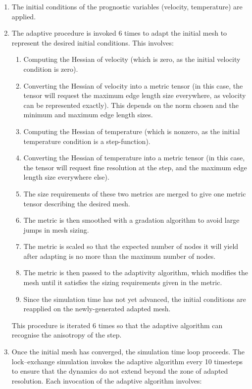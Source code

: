 \begin{enumerate}
\item The initial conditions of the prognostic variables (velocity, temperature) are applied.
\item The adaptive procedure is invoked 6 times to adapt the initial mesh to represent the
desired initial conditions. This involves:
  \begin{enumerate}
  \item Computing the Hessian of velocity (which is zero, as the initial velocity condition is zero).
  \item Converting the Hessian of velocity into a metric tensor (in this case, the tensor will request the maximum
        edge length size everywhere, as velocity can be represented exactly). This depends on the norm chosen and the minimum
        and maximum edge length sizes.
  \item Computing the Hessian of temperature (which is nonzero, as the initial temperature condition is a step-function).
  \item Converting the Hessian of temperature into a metric tensor (in this case, the tensor will request fine resolution
        at the step, and the maximum edge length size everywhere else).
  \item The size requirements of these two metrics are merged to give one metric tensor describing the desired mesh.
  \item The metric is then smoothed with a gradation algorithm to avoid large jumps in mesh sizing.
  \item The metric is scaled so that the expected number of nodes it will yield after adapting is no more than the maximum number of nodes.
  \item The metric is then passed to the adaptivity algorithm, which modifies the mesh until it satisfies the sizing requirements given in the metric.
  \item Since the simulation time has not yet advanced, the initial conditions are reapplied on the newly-generated adapted mesh. 
  \end{enumerate}
     This procedure is iterated 6 times so that the adaptive algorithm can recognise the anisotropy of the step.
\item Once the initial mesh has converged, the simulation time loop proceeds. The lock--exchange simulation invokes
the adaptive algorithm every 10 timesteps to ensure that the dynamics do not extend beyond the zone of adapted
resolution. Each invocation of the adaptive algorithm involves:

\end{enumerate}
